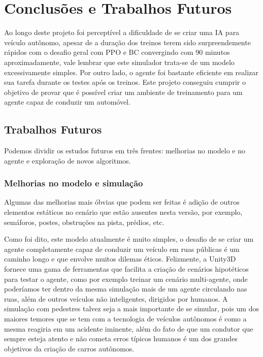 \chapter*{Conclusões e Trabalhos Futuros}\label{cap:conclusao}

Ao longo deste projeto foi perceptível a dificuldade de se criar uma IA para veículo autônomo, apesar de a duração dos treinos terem sido surpreendemente rápidos com o desafio geral com PPO e BC convergindo com 90 minutos aproximadamente, vale lembrar que este simulador trata-se de um modelo excessivamente simples. Por outro lado, o agente foi bastante eficiente em realizar sua tarefa durante os testes após os treinos. Este projeto conseguiu cumprir o objetivo de provar que é possível criar um ambiente de treinamento para um agente capaz de conduzir um automóvel.

\section*{Trabalhos Futuros}

Podemos dividir os estudos futuros em três frentes: melhorias no modelo e no agente e exploração de novos algoritmos.

\subsection*{Melhorias no modelo e simulação}
Algumas das melhorias mais óbvias que podem ser feitas é adição de outros elementos estáticos no cenário que estão ausentes nesta versão, por exemplo, semáforos, postes, obstruções na pista, prédios, etc. 

Como foi dito, este modelo atualmente é muito simples, o desafio de se criar um agente completamente capaz de conduzir um veículo em ruas públicas é um caminho longo e que envolve muitos dilemas éticos. Felizmente, a Unity3D fornece uma gama de ferramentas que facilita a criação de cenários hipotéticos para testar o agente, como por exemplo treinar um cenário multi-agente, onde poderíamos ter dentro da mesma simulação mais de um agente circulando nas ruas, além de outros veículos não inteligentes, dirigidos por humanos. A simulação com pedestres talvez seja a mais importante de se simular, pois um dos maiores temores que se tem com a tecnologia de veículos autônomos é como a mesma reagiria em um acidente iminente, além do fato de que um condutor que sempre esteja atento e não cometa erros típicos humanos é um dos grandes objetivos da criação de carros autônomos.


